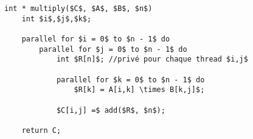 \begin{lstlisting}[mathescape, style=cilk, title=Algorithme parallèle modifié.]
int * multiply($C$, $A$, $B$, $n$)
    int $i$,$j$,$k$;

    parallel for $i = 0$ to $n - 1$ do
        parallel for $j = 0$ to $n - 1$ do
            int $R[n]$; //privé pour chaque thread $i,j$
        
            parallel for $k = 0$ to $n - 1$ do
                $R[k] = A[i,k] \times B[k,j]$;
                
            $C[i,j] =$ add($R$, $n$);
    
    return C;
\end{lstlisting}